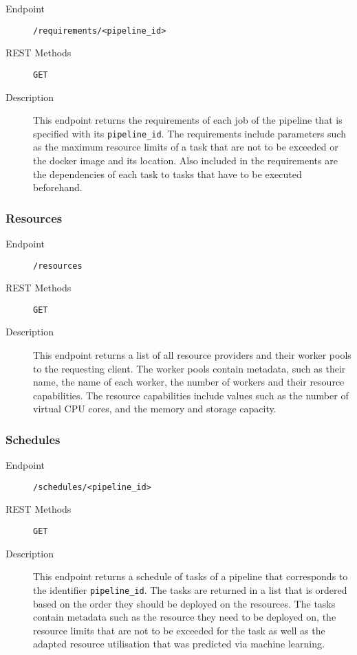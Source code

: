 \documentclass{article}
\begin{document}
                \begin{description}
                    \item[Endpoint] \texttt{/requirements/<pipeline\_id>}
                    \item[REST Methods] \texttt{GET}
                    \item[Description] This endpoint returns the requirements of each job of the pipeline that is specified with its \texttt{pipeline\_id}. The requirements include parameters such as the maximum resource limits of a task that are not to be exceeded or the docker image and its location. Also included in the requirements are the dependencies of each task to tasks that have to be executed beforehand.
                \end{description}
                
                \subsubsection{Resources}
                
                \begin{description}
                    \item[Endpoint] \texttt{/resources}
                    \item[REST Methods] \texttt{GET}
                    \item[Description] This endpoint returns a list of all resource providers and their worker pools to the requesting client. The worker pools contain metadata, such as their name, the name of each worker, the number of workers and their resource capabilities. The resource capabilities include values such as the number of virtual CPU cores, and the memory and storage capacity.
                \end{description}
                
                \subsubsection{Schedules}
        
                \begin{description}
                    \item[Endpoint] \texttt{/schedules/<pipeline\_id>}
                    \item[REST Methods] \texttt{GET}
                    \item[Description] This endpoint returns a schedule of tasks of a pipeline that corresponds to the identifier \texttt{pipeline\_id}. The tasks are returned in a list that is ordered based on the order they should be deployed on the resources. The tasks contain metadata such as the resource they need to be deployed on, the resource limits that are not to be exceeded for the task as well as the adapted resource utilisation that was predicted via machine learning.
                \end{description}
\end{document}

